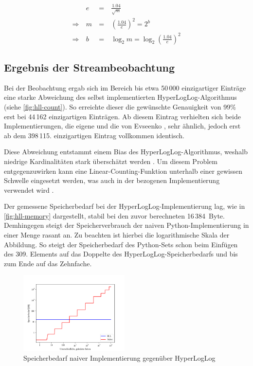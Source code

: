 \begin{equation}
	\begin{alignedat}{2}
		& e & \: = \: & \frac{1.04}{\sqrt{m}} \\
		\Rightarrow \: & m & \: = \: & \left(\frac{1.04}{e}\right)^2 = 2^b \\
		\Rightarrow \: & b & \: = \: & \log_2 m = \log_2 \left(\frac{1.04}{e}\right)^2
	\end{alignedat}
	\label{eq:target-error}
\end{equation}

\subsection{Ergebnis der Streambeobachtung}

Bei der Beobachtung ergab sich im Bereich bis etwa 50\,000 einzigartiger Einträge eine starke Abweichung des selbst implementierten HyperLogLog-Algorithmus (siehe \autoref{fig:hll-count}).
So erreichte dieser die gewünschte Genauigkeit von 99\% erst bei 44\,162 einzigartigen Einträgen.
Ab diesem Eintrag verhielten sich beide Implementierungen, die eigene und die von Evseenko \cite{evseenko2018}, sehr ähnlich, jedoch erst ab dem 398\,115. einzigartigen Eintrag vollkommen identisch.

Diese Abweichung entstammt einem Bias des HyperLogLog-Algorithmus, weshalb niedrige Kardinalitäten stark überschätzt werden \cite{heule2013}.
Um diesem Problem entgegenzuwirken kann eine Linear-Counting-Funktion unterhalb einer gewissen Schwelle eingesetzt werden, was auch in der bezogenen Implementierung verwendet wird \cite{evseenko2018}.

Der gemessene Speicherbedarf bei der HyperLogLog-Implementierung lag, wie in \autoref{fig:hll-memory} dargestellt, stabil bei den zuvor berechneten 16\,384~Byte.
Demhingegen steigt der Speicherverbrauch der naiven Python-Implementierung in einer Menge rasant an.
Zu beachten ist hierbei die logarithmische Skala der Abbildung.
So steigt der Speicherbedarf des Python-Sets schon beim Einfügen des 309.
Elements auf das Doppelte des HyperLogLog-Speicherbedarfs und bis zum Ende auf das Zehnfache.

\begin{figure}[t]
	\centering
	\includegraphics[width=0.49\textwidth]{images/hll_memory.png}
	\caption{Speicherbedarf naiver Implementierung gegenüber HyperLogLog}
	\label{fig:hll-memory}
\end{figure}

